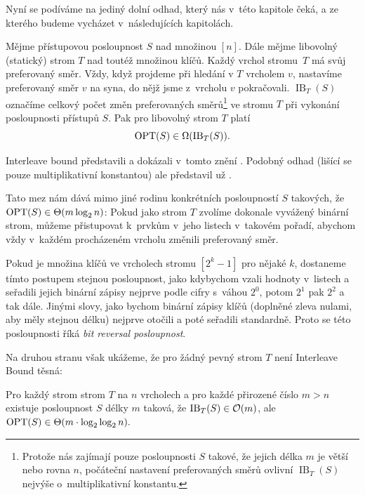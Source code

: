 Nyní se podíváme na jediný dolní odhad, který nás v~této kapitole čeká, a ze kterého budeme vycházet v~následujících kapitolách.

\def\ib{\operatorname{IB}}

\begin{veta}
Mějme přístupovou posloupnost $S$ nad množinou $[n]$. Dále mějme libovolný
(statický) strom $T$ nad toutéž množinou klíčů. Každý vrchol stromu~$T$ má svůj
preferovaný směr. Vždy, když projdeme při hledání v $T$ vrcholem $v$, nastavíme preferovaný směr
$v$ na syna, do nějž jsme z~vrcholu $v$ pokračovali. $\ib_T(S)$ označíme
celkový počet změn preferovaných směrů\footnote{Protože nás zajímají pouze
posloupnosti $S$ takové, že jejich délka $m$ je větší nebo rovna $n$, počáteční
nastavení preferovaných směrů ovlivní $\ib_T(S)$ nejvýše o~multiplikativní
konstantu.} ve stromu $T$ při vykonání posloupnosti přístupů $S$. Pak pro
libovolný strom $T$ platí $$\opt(S) \in \Omega(\ib_T(S)).$$ 
\end{veta}

Interleave bound představili a dokázali v~tomto znění \citet{tango}. Podobný odhad (lišící se pouze multiplikativní konstantou) ale představil už \citet{interleave}.

Tato mez nám dává mimo jiné rodinu konkrétních posloupností $S$ takových, že
$\opt(S)\in\Theta(m\log n)$: Pokud jako strom $T$ zvolíme dokonale vyvážený
binární strom, můžeme přistupovat k~prvkům v~jeho listech v~takovém pořadí,
abychom vždy v~každém procházeném vrcholu změnili preferovaný směr.

Pokud je množina klíčů ve vrcholech stromu $[2^k-1]$ pro nějaké $k$, dostaneme
tímto postupem stejnou posloupnost, jako kdybychom vzali hodnoty v~listech a
seřadili jejich binární zápisy nejprve podle cifry s~váhou $2^0$, potom $2^1$
pak $2^2$ a tak dále. Jinými slovy, jako bychom binární zápisy klíčů (doplněné
zleva nulami, aby měly stejnou délku) nejprve otočili a poté seřadili
standardně. Proto se této posloupnosti říká \emph{bit reversal posloupnost}.

Na druhou stranu však ukážeme, že pro žádný pevný strom $T$ není Interleave Bound těsná:
\begin{tvrz}
Pro každý strom strom $T$ na $n$ vrcholech a pro každé přirozené číslo $m>n$ existuje posloupnost $S$ délky $m$ taková, že $\ib_T(S) \in \o(m)$, ale $\opt(S) \in \Theta(m\cdot\log\log n).$ 
\end{tvrz}

